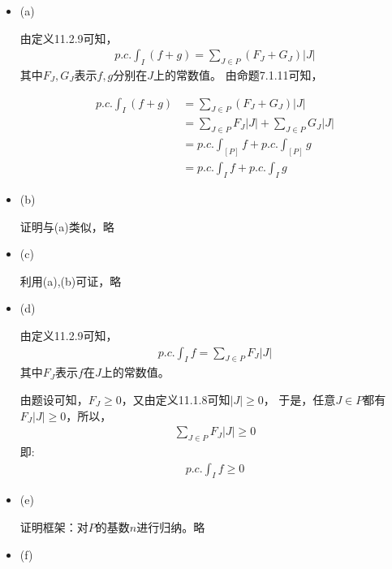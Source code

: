\documentclass{article}
\begin{document}
\begin{itemize}
  \item (a)

        由定义11.2.9可知，
        \begin{align*}
          p.c.\int_{I} (f + g) = \sum\limits_{J \in P} (F_J + G_J) |J|
        \end{align*}
        其中$F_J, G_J$表示$f,g$分别在$J$上的常数值。
        由命题7.1.11可知，

        \begin{align*}
          p.c.\int_{I} (f + g) & = \sum\limits_{J \in P} (F_J + G_J) |J|                         \\
                               & = \sum\limits_{J \in P} F_J |J| + \sum\limits_{J \in P} G_J |J| \\
                               & = p.c.\int_{[P]} f + p.c.\int_{[P]} g                           \\
                               & = p.c.\int_{I} f + p.c.\int_{I} g
        \end{align*}

  \item (b)

        证明与(a)类似，略
  \item (c)

        利用(a),(b)可证，略

  \item (d)

        由定义11.2.9可知，
        \begin{align*}
          p.c.\int_{I} f = \sum\limits_{J \in P} F_J |J|
        \end{align*}
        其中$F_J$表示$f$在$J$上的常数值。

        由题设可知，$F_J \geq 0$，又由定义11.1.8可知$|J| \geq 0$，
        于是，任意$J \in P$都有$F_J |J| \geq 0$，所以，
        \begin{align*}
          \sum\limits_{J \in P} F_J |J| \geq 0
        \end{align*}
        即:
        \begin{align*}
          p.c.\int_{I} f \geq 0
        \end{align*}

  \item (e)

        证明框架：对$P$的基数$n$进行归纳。略

  \item (f)


\end{itemize}
\end{document}
